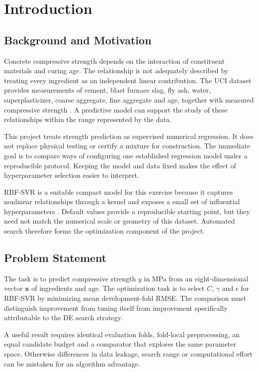 \chapter{Introduction}
\section{Background and Motivation}
Concrete compressive strength depends on the interaction of constituent materials and curing age. The relationship is not adequately described by treating every ingredient as an independent linear contribution. The UCI dataset provides measurements of cement, blast furnace slag, fly ash, water, superplasticizer, coarse aggregate, fine aggregate and age, together with measured compressive strength \cite{uci,yeh}. A predictive model can support the study of these relationships within the range represented by the data.

This project treats strength prediction as supervised numerical regression. It does not replace physical testing or certify a mixture for construction. The immediate goal is to compare ways of configuring one established regression model under a reproducible protocol. Keeping the model and data fixed makes the effect of hyperparameter selection easier to interpret.

RBF-SVR is a suitable compact model for this exercise because it captures nonlinear relationships through a kernel and exposes a small set of influential hyperparameters \cite{svr}. Default values provide a reproducible starting point, but they need not match the numerical scale or geometry of this dataset. Automated search therefore forms the optimization component of the project.
\section{Problem Statement}
The task is to predict compressive strength $y$ in MPa from an eight-dimensional vector $\mathbf{x}$ of ingredients and age. The optimization task is to select $C$, $\gamma$ and $\epsilon$ for RBF-SVR by minimizing mean development-fold RMSE. The comparison must distinguish improvement from tuning itself from improvement specifically attributable to the DE search strategy.

A useful result requires identical evaluation folds, fold-local preprocessing, an equal candidate budget and a comparator that explores the same parameter space. Otherwise differences in data leakage, search range or computational effort can be mistaken for an algorithm advantage.
